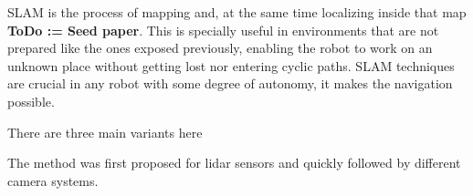     SLAM is the process of mapping and, at the same time localizing inside that map \textbf{ToDo := Seed paper}. This is specially useful in environments that are not prepared like the ones exposed previously, enabling the robot to work on an unknown place without getting lost nor entering cyclic paths. SLAM techniques are crucial in any robot with some degree of autonomy, it makes the navigation possible. 

    There are three main variants here

    The method was first proposed for lidar sensors and quickly followed by different camera systems.

  \begin{comment}
    Organization:
      - Localization and mapping: Talk about Localization techniques:
        - Outdoor: GPS
        - Indoor: Bluetooth/WiFi Beacons, OptiTrack camera, Image-Based algorithms
  \end{comment}

  \begin{comment}
    \begin{itemize}
    \end{itemize}
  \end{comment}
